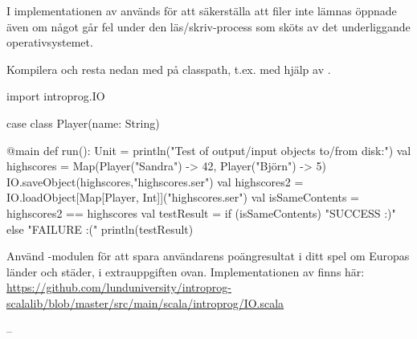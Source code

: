 I implementationen av  används  för att säkerställa att filer inte lämnas öppnade även om något går fel under den läs/skriv-process som sköts av det underliggande operativsystemet.

\Subtask
Kompilera och resta nedan med  på classpath, t.ex. med hjälp av .
\begin{Code}
import introprog.IO

case class Player(name: String)

@main def run(): Unit = 
  println("Test of output/input objects to/from disk:")
  val highscores = Map(Player("Sandra") -> 42, Player("Björn") -> 5)
  IO.saveObject(highscores,"highscores.ser")
  val highscores2 = IO.loadObject[Map[Player, Int]]("highscores.ser")
  val isSameContents = highscores2 == highscores
  val testResult = if (isSameContents) "SUCCESS :)" else "FAILURE :("
  println(testResult)
\end{Code}

\Subtask
Använd -modulen för att spara användarens poängresultat i ditt spel om Europas länder och städer, i extrauppgiften ovan. Implementationen av  finns här: \url{https://github.com/lunduniversity/introprog-scalalib/blob/master/src/main/scala/introprog/IO.scala} 

\SOLUTION

\TaskSolved --

\QUESTEND



